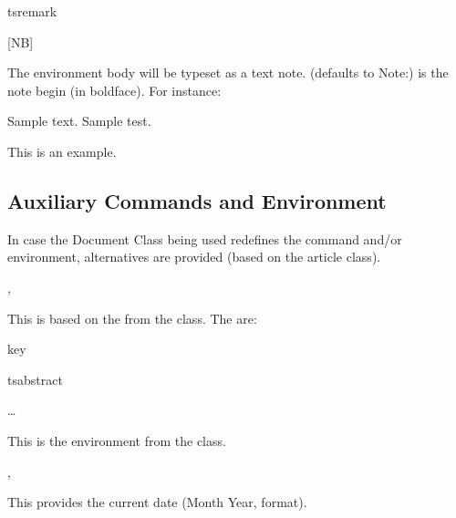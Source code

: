 \documentclass{article}
\begin{document}
\begin{codedescribe}[env]{tsremark}
\begin{codesyntax}
\tsmacro{\begin{tsremark}}[NB]{}
\tsmacro{\end{tsremark}}{}
\end{codesyntax}
 The environment body will be typeset as a text note.  (defaults to Note:) is the note begin (in boldface). For instance:
 \begin{codestore}
 Sample text. Sample test.
  \begin{tsremark}[N.B.]
    This is an example.
  \end{tsremark}
 \end{codestore}
\end{codedescribe}

\subsection{Auxiliary Commands and Environment}
In case the Document Class being used redefines the \tsobj[code]{\maketitle} command and/or  environment, alternatives are provided (based on the article class).

\begin{codedescribe}[code]{\typesettitle,\tstitle}
\begin{codesyntax}
\end{codesyntax}
This is based on the \tsobj[code]{\maketitle} from the  class. The  are:
\end{codedescribe}

\begin{describelist*}{key}
\end{describelist*}

\begin{codedescribe}[env]{tsabstract}
\begin{codesyntax}
\tsmacro{\begin{tsabstract}}{}
\ldots
\tsmacro{\end{tsabstract}}{}
\end{codesyntax}
This is the  environment from the  class.
\end{codedescribe}

\begin{codedescribe}[code,new=2023/05/16]{\typesetdate,\tsdate}
\begin{codesyntax}
\tsmacro{\typesetdate}{}
\tsmacro{\tsdate}{}
\end{codesyntax}
This provides the current date (Month Year, format).
\end{codedescribe}

\printbibliography
\end{document}
